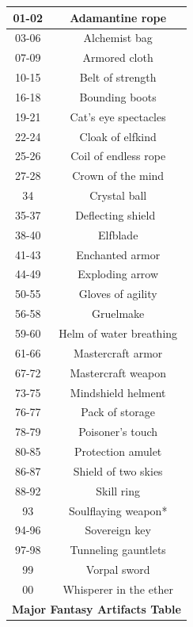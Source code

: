 \begin{longtable}{| c | c |}
    01-02 & Adamantine rope \\ \hline
    03-06 & Alchemist bag \\ \hline
    07-09 & Armored cloth \\ \hline
    10-15 & Belt of strength \\ \hline
    16-18 & Bounding boots \\ \hline
    19-21 & Cat’s eye spectacles \\ \hline
    22-24 & Cloak of elfkind \\ \hline
    25-26 & Coil of endless rope \\ \hline
    27-28 & Crown of the mind \\ \hline
    34 & Crystal ball \\ \hline
    35-37 & Deflecting shield  \\ \hline
    38-40 & Elfblade \\ \hline
    41-43 & Enchanted armor \\ \hline
    44-49 & Exploding arrow \\ \hline
    50-55 & Gloves of agility \\ \hline
    56-58 & Gruelmake \\ \hline
    59-60 & Helm of water breathing \\ \hline
    61-66 & Mastercraft armor \\ \hline
    67-72 & Mastercraft weapon \\ \hline
    73-75 & Mindshield helment \\ \hline
    76-77 & Pack of storage \\ \hline
    78-79 & Poisoner’s touch \\ \hline
    80-85 & Protection amulet \\ \hline
    86-87 & Shield of two skies \\ \hline
    88-92 & Skill ring \\ \hline
    93 & Soulflaying weapon* \\ \hline
    94-96 & Sovereign key \\ \hline
    97-98 & Tunneling gauntlets \\ \hline
    99 & Vorpal sword \\ \hline
    00 & Whisperer in the ether \\ \hline
    
    \multicolumn{2}{|c|}{\textbf{Major Fantasy Artifacts Table}} \\ \hline
    

\end{longtable}
